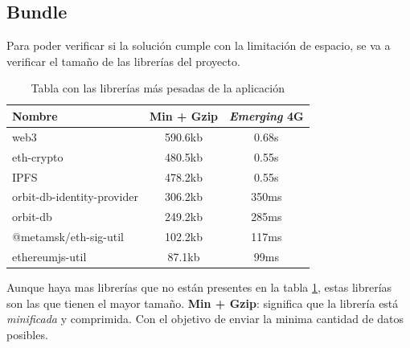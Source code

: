 \subsection{Bundle}
Para poder verificar si la solución cumple con la limitación de espacio, se va a verificar el tamaño de las librerías del proyecto.
\begin{table}[h!]
    \centering
    \begin{tabular}{|l|c|c|}
        \hline
        Nombre                      & Min + Gzip            & \textit{Emerging} 4G  \\
        \hline
        web3                        & 590.6kb               & 0.68s                 \\
        \hline
        eth-crypto                  & 480.5kb               & 0.55s                 \\
        \hline
        IPFS                        & 478.2kb               & 0.55s                 \\
        \hline
        orbit-db-identity-provider  & 306.2kb               & 350ms                 \\
        \hline
        orbit-db                    & 249.2kb               & 285ms                 \\
        \hline
        @metamsk/eth-sig-util       & 102.2kb               & 117ms                 \\
        \hline
        ethereumjs-util             & 87.1kb                & 99ms                  \\
        \hline
    \end{tabular}
    \caption{Tabla con las librerías más pesadas de la aplicación}
    \label{fg:tamaño}
    \cite{web:bundle}
\end{table}
Aunque haya mas librerías que no están presentes en la tabla \ref{fg:tamaño}, estas librerías son las que tienen el mayor tamaño. \textbf{Min + Gzip}: significa que la librería está \textit{minificada} y comprimida. Con el objetivo de enviar la minima cantidad de datos posibles.
